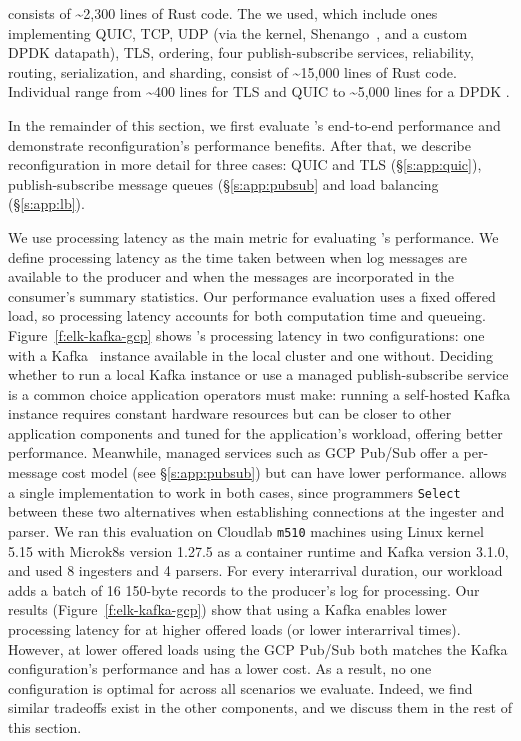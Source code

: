 \etlapp consists of \textasciitilde 2,300 lines of Rust code.
The \tunnels we used, which include ones implementing QUIC, TCP, UDP (via the kernel, Shenango~\cite{shenango}, and a custom DPDK datapath), TLS, ordering, four publish-subscribe services, reliability, routing, serialization, and sharding, consist of  \textasciitilde 15,000 lines of Rust code. Individual \tunnels range from \textasciitilde 400 lines for TLS and QUIC \tunnels to \textasciitilde 5,000 lines for a DPDK \tunnel.


In the remainder of this section, we first evaluate \etlapp's end-to-end performance and demonstrate reconfiguration's performance benefits. After that, we describe reconfiguration in more detail for three cases: QUIC and TLS (\S\ref{s:app:quic}), publish-subscribe message queues (\S\ref{s:app:pubsub} and load balancing (\S\ref{s:app:lb}). 

 We use processing latency as the main metric for evaluating \etlapp's performance. We define processing latency as the time taken between when log messages are available to the producer and when the messages are incorporated in the consumer's summary statistics. Our performance evaluation uses a fixed offered load, so processing latency accounts for both computation time and queueing.
Figure~\ref{f:elk-kafka-gcp} shows \etlapp's processing latency in two configurations: one with a Kafka~\cite{kafka} instance available in the local cluster and one without. 
Deciding whether to run a local Kafka instance or use a managed publish-subscribe service is a common choice application operators must make: running a self-hosted Kafka instance requires constant hardware resources but can be closer to other application components and tuned for the application's workload, offering better performance. Meanwhile, managed services such as GCP Pub/Sub offer a per-message cost model (see \S\ref{s:app:pubsub}) but can have lower performance. \name allows a single \etlapp implementation to work in both cases, since programmers \texttt{Select} between these two alternatives when establishing connections at the ingester and parser. We ran this evaluation on Cloudlab \texttt{m510}
machines using Linux kernel 5.15 with Microk8s version 1.27.5 as a container runtime and Kafka version 3.1.0, and used 8 ingesters and 4 parsers. For every interarrival duration, our workload adds a batch of 16 150-byte records to the producer's log for processing. Our results (Figure~\ref{f:elk-kafka-gcp}) show that using a Kafka \tunnel enables lower processing latency for \etlapp at higher offered loads (or lower interarrival times). 
However, at lower offered loads using the GCP Pub/Sub \tunnel both matches the Kafka configuration's performance and has a lower cost.  As a result, no one configuration is optimal for \etlapp across all scenarios we evaluate.  Indeed, we find similar tradeoffs exist in the other \etlapp components, and we discuss them in the rest of this section.


